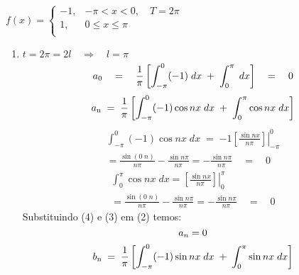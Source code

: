 \documentclass[12pt]{article}
\newcommand*\Eval[3]{\left.#1\right\rvert_{#2}^{#3}}
\begin{document}
\section{}
$
f(x)= 
    \begin{cases}
    -1 , & -\pi < x < 0,\quad T=2\pi\\
    1 , & 0 \leq x \leq \pi\\
    \end{cases}
$
\begin{enumerate}[label=S.]
    \item 
    $t=2\pi = 2l \quad\Rightarrow\quad l = \pi$
    \begin{equation}
    {a\textsubscript{0}} \quad=\quad \frac{1}{\pi} \left[\int_{-\pi}^{0} (-1) \;dx\;+\; \int_{0}^{\pi} \; dx\right] \quad=\quad 0
    \end{equation}
    \begin{equation}
    \begin{split}
    {a\textsubscript{n}} \;=\; \frac{1}{\pi} \left[\int_{-\pi}^{0} (-1) \cos nx \;dx\;+\; \int_{0}^{\pi} \cos nx\; dx\right] 
    \end{split}
    \end{equation}
    \begin{equation}
    \begin{split}
    \int_{-\pi}^{0} (-1) \cos nx \;dx \; = \; \Eval{-1\left[ \frac{ \sin nx}{n\pi}\right]}{-\pi}{0} \\
    = \frac{\sin(0\;n)}{n\pi} - \frac{\sin n\pi}{n\pi} = - \frac{\sin n\pi}{n\pi} \quad=\quad 0
    \end{split}
    \end{equation}
    \begin{equation}
    \begin{split}
    \int_{0}^{\pi} \cos nx\; dx = \Eval{\left[ \frac{ \sin nx}{n\pi}\right]}{0}{\pi} \\
    = \frac{\sin(0\;n)}{n\pi} - \frac{\sin n\pi}{n\pi} = - \frac{\sin n\pi}{n\pi} \quad=\quad 0
    \end{split}
    \end{equation}
    Substituindo (4) e (3) em (2) temos:
    \begin{equation}
    a_{n}=0\\
    \end{equation}
    \begin{equation}
    {b\textsubscript{n}} \;=\; \frac{1}{\pi} \left[\int_{-\pi}^{0} (-1) \sin nx \;dx\;+\; \int_{0}^{\pi} \sin nx\; dx\right] 
    \end{equation}

\end{enumerate}
\end{document}
